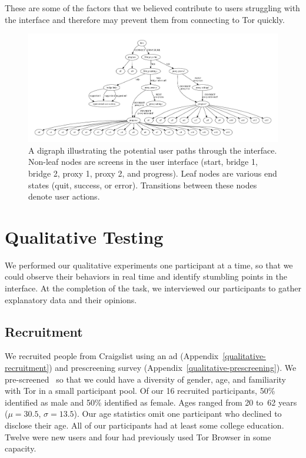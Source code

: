 \documentclass[USenglish,oneside,twocolumn]{article}
\begin{document}
These are some of the factors that we believed contribute to users struggling with the interface and therefore may prevent them from connecting to Tor quickly.


\begin{figure}
\centering
\includegraphics[width=\textwidth]{torconfig.pdf}
\caption{
A digraph illustrating the potential user paths through the interface. Non-leaf nodes are screens in the user interface (start, bridge 1, bridge 2, proxy 1, proxy 2, and progress). Leaf nodes are various end states (quit, success, or error). Transitions between these nodes denote user actions. 
}
\label{fig:digraph}
\end{figure} 

\section{Qualitative Testing}
\label{sec:qualitative}
We performed our qualitative experiments one participant at a time, so that we could observe their behaviors in real time and identify stumbling points in the interface.
At the completion of the task, we interviewed our participants to gather explanatory data and their opinions.

\subsection{Recruitment}
We recruited people from Craigslist using an ad (Appendix~\ref{qualitative-recruitment}) and prescreening survey (Appendix~\ref{qualitative-prescreening}). We pre-screened~\cite{screening} so that we could have a diversity of gender, age, and familiarity with Tor in a small participant pool. Of our 16 recruited participants, 50\% identified as male and 50\% identified as female. Ages ranged from 20 to~62 years ($\mu = 30.5$, $\sigma = 13.5$). Our age statistics omit one participant who declined to disclose their age. All of our participants had at least some college education. Twelve were new users and four had previously used Tor Browser in some capacity.  
\end{document}
